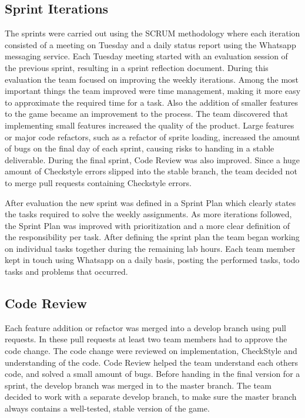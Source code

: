 \documentclass[10pt]{article}
\begin{document}
\subsection*{Sprint Iterations}
The sprints were carried out using the SCRUM methodology where each iteration consisted of a meeting on Tuesday and a daily status report using the Whatsapp messaging service. Each Tuesday meeting started with an evaluation session of the previous sprint, resulting in a sprint reflection document. 
During this evaluation the team focused on improving the weekly iterations. Among the most important things the team improved were time management, making it more easy to approximate the required time for a task. Also the addition of smaller features to the game became an improvement to the process. The team discovered that implementing small features increased the quality of the product. Large features or major code refactors, such as a refactor of sprite loading, increased the amount of bugs on the final day of each sprint, causing risks to handing in a stable deliverable. During the final sprint, Code Review was also improved. Since a huge amount of Checkstyle errors slipped into the stable branch, the team decided not to merge pull requests containing Checkstyle errors.

After evaluation the new sprint was defined in a Sprint Plan which clearly states the tasks required to solve the weekly assignments. As more iterations followed, the Sprint Plan was improved with prioritization and a more clear definition of the responsibility per task. After defining the sprint plan the team began working on individual tasks together during the remaining lab hours. Each team member kept in touch using Whatsapp on a daily basis, posting the performed tasks, todo tasks and problems that occurred. 

\subsection*{Code Review}
Each feature addition or refactor was merged into a develop branch using pull requests. In these pull requests at least two team members had to approve the code change. The code change were reviewed on implementation, CheckStyle and understanding of the code. Code Review helped the team understand each others code, and solved a small amount of bugs. Before handing in the final version for a sprint, the develop branch was merged in to the master branch. The team decided to work with a separate develop branch, to make sure the master branch always contains a well-tested, stable version of the game.
\end{document}
